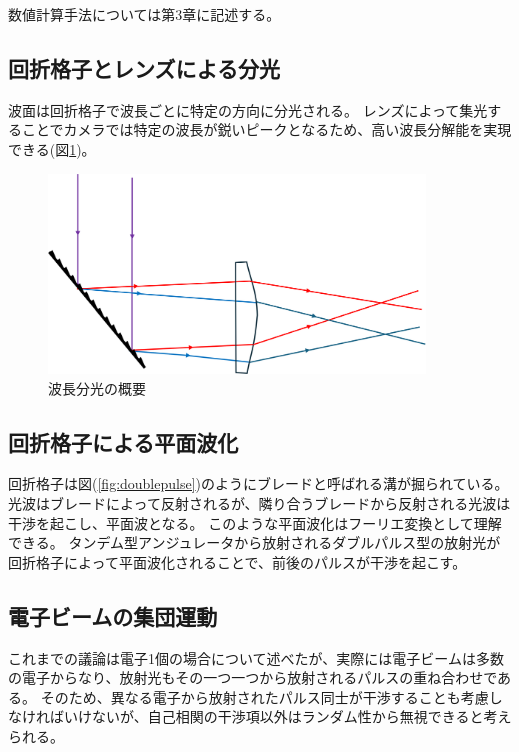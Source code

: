 \documentclass[a4paper,11pt,uplatex]{jsbook}
\begin{document}
数値計算手法については第3章に記述する。
\subsection{回折格子とレンズによる分光}\label{sec:grating}
波面は回折格子で波長ごとに特定の方向に分光される。
レンズによって集光することでカメラでは特定の波長が鋭いピークとなるため、高い波長分解能を実現できる(図\ref{fig:dispersion})。
\begin{figure}[H]
  \centering
  \includegraphics[width=10cm]{image/2-dispersion.png}
  \caption{波長分光の概要}\label{fig:dispersion}
\end{figure}
\subsection{回折格子による平面波化}\label{sec:grating2}
回折格子は図(\ref{fig:doublepulse})のようにブレードと呼ばれる溝が掘られている。
光波はブレードによって反射されるが、隣り合うブレードから反射される光波は干渉を起こし、平面波となる。
このような平面波化はフーリエ変換として理解できる。
タンデム型アンジュレータから放射されるダブルパルス型の放射光が回折格子によって平面波化されることで、前後のパルスが干渉を起こす。
\subsection{電子ビームの集団運動}
これまでの議論は電子1個の場合について述べたが、実際には電子ビームは多数の電子からなり、放射光もその一つ一つから放射されるパルスの重ね合わせである。
そのため、異なる電子から放射されたパルス同士が干渉することも考慮しなければいけないが、自己相関の干渉項以外はランダム性から無視できると考えられる。
\end{document}
